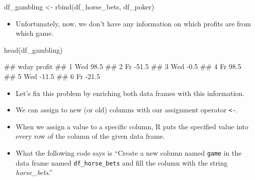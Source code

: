 \documentclass[
]{book}
\newenvironment{Shaded}{\begin{snugshade}}{\end{snugshade}}
\newcommand{\FunctionTok}[1]{\textcolor[rgb]{0.00,0.00,0.00}{#1}}
\newcommand{\NormalTok}[1]{#1}
\newcommand{\OtherTok}[1]{\textcolor[rgb]{0.56,0.35,0.01}{#1}}
\newcommand{\SpecialCharTok}[1]{\textcolor[rgb]{0.00,0.00,0.00}{#1}}
\newcommand{\StringTok}[1]{\textcolor[rgb]{0.31,0.60,0.02}{#1}}
\providecommand{\tightlist}{%
  \setlength{\itemsep}{0pt}\setlength{\parskip}{0pt}}
\begin{document}
\begin{Shaded}
\begin{Highlighting}[]
\NormalTok{df\_gambling }\OtherTok{\textless{}{-}} \FunctionTok{rbind}\NormalTok{(df\_horse\_bets, df\_poker)}
\end{Highlighting}
\end{Shaded}

\begin{itemize}
\tightlist
\item
  Unfortunately, now, we don't have any information on which profits are from which game.
\end{itemize}

\begin{Shaded}
\begin{Highlighting}[]
\FunctionTok{head}\NormalTok{(df\_gambling)}
\end{Highlighting}
\end{Shaded}

\begin{Shaded}
\begin{Highlighting}[]
\NormalTok{\#\#   wday profit}
\NormalTok{\#\# 1  Wed   98.5}
\NormalTok{\#\# 2   Fr  {-}51.5}
\NormalTok{\#\# 3  Wed   {-}0.5}
\NormalTok{\#\# 4   Fr   98.5}
\NormalTok{\#\# 5  Wed  {-}11.5}
\NormalTok{\#\# 6   Fr  {-}21.5}
\end{Highlighting}
\end{Shaded}

\begin{itemize}
\tightlist
\item
  Let's fix this problem by enriching both data frames with this information.
\item
  We can assign to new (or old) columns with our assignment operator \texttt{\textless{}-}.
\item
  When we assign a value to a specific column, R puts the specified value into every row of the column of the given data frame.
\item
  What the following code says is ``Create a new column named \texttt{game} in the data frame named \texttt{df\_horse\_bets} and fill the column with the string \emph{horse\_bets}.''
\end{itemize}

\begin{Shaded}
\end{Shaded}
\end{document}
